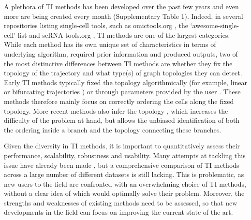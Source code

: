 A plethora of TI methods has been developed over the past few years and even more are being created every month (Supplementary Table 1). Indeed, in several repositories listing single-cell tools, such as omictools.org \cite{henry_omictoolsinformativedirectory_2014}, the ‘awesome-single-cell’ list \cite{davis_awesomesinglecell_2018} and scRNA-tools.org \cite{zappia_exploringsinglecellrnaseq_2017}, TI methods are one of the largest categories. While each method has its own unique set of characteristics in terms of underlying algorithm, required prior information and produced outputs, two of the most distinctive differences between TI methods are whether they fix the topology of the trajectory and what type(s) of graph topologies they can detect. Early TI methods typically fixed the topology algorithmically (for example, linear \cite{bendall_singlecelltrajectorydetection_2014,schlitzer_identificationcdc1cdc2committed_2015,shin_singlecellrnaseqwaterfall_2015,campbell_bayesiangaussianprocess_2015} or bifurcating trajectories \cite{haghverdi_diffusionpseudotimerobustly_2016,setty_wishboneidentifiesbifurcating_2016}) or through parameters provided by the user \cite{trapnell_dynamicsregulatorscell_2014,matsumoto_scoupprobabilisticmodel_2016}. These methods therefore mainly focus on correctly ordering the cells along the fixed topology. More recent methods also infer the topology \cite{qiu_reversedgraphembedding_2017,street_slingshotcelllineage_2018,wolf_graphabstractionreconciles_2017}, which increases the difficulty of the problem at hand, but allows the unbiased identification of both the ordering inside a branch and the topology connecting these branches.

Given the diversity in TI methods, it is important to quantitatively assess their performance, scalability, robustness and usability. Many attempts at tackling this issue have already been made \cite{haghverdi_diffusionpseudotimerobustly_2016,ji_tscanpseudotimereconstruction_2016,welch_slicerinferringbranched_2016,matsumoto_scoupprobabilisticmodel_2016,duverle_celltreebioconductorpackage_2016,cannoodt_computationalmethodstrajectory_2016,lonnberg_singlecellrnaseqcomputational_2017,campbell_probabilisticmodelingbifurcations_2017,wolf_graphabstractionreconciles_2017}, but a comprehensive comparison of TI methods across a large number of different datasets is still lacking. This is problematic, as new users to the field are confronted with an overwhelming choice of TI methods, without a clear idea of which would optimally solve their problem. Moreover, the strengths and weaknesses of existing methods need to be assessed, so that new developments in the field can focus on improving the current state-of-the-art.

